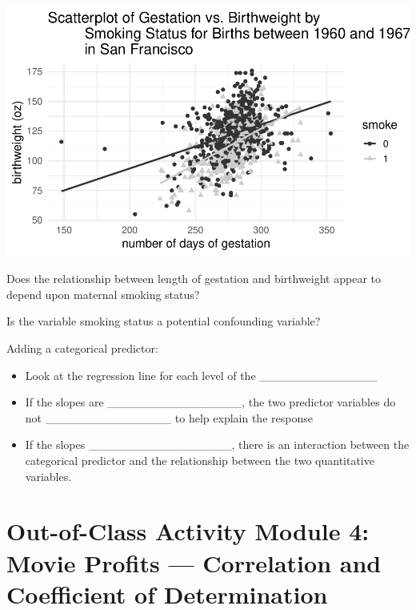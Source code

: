\documentclass[
]{report}
\begin{document}
\begin{center}\includegraphics[width=0.8\linewidth]{04-LN04-two-quantitativeEDA_files/figure-latex/unnamed-chunk-8-1} \end{center}

Does the relationship between length of gestation and birthweight appear to depend upon maternal smoking status?

\vspace{1in}

Is the variable smoking status a potential confounding variable?

\vspace{1in}

Adding a categorical predictor:


\begin{itemize}
\item
  Look at the regression line for each level of the \_\_\_\_\_\_\_\_\_\_\_\_\_\_
\item
  If the slopes are \_\_\_\_\_\_\_\_\_\_\_\_\_\_\_\_, the two predictor variables do not \_\_\_\_\_\_\_\_\_\_\_\_\_\_\_ to help explain the response
\item
  If the slopes \_\_\_\_\_\_\_\_\_\_\_\_\_\_\_\_\_, there is an interaction between the categorical predictor and the relationship between the two quantitative variables.
\end{itemize}


\newpage

\hypertarget{out-of-class-activity-module-4-movie-profits-correlation-and-coefficient-of-determination}{%
\section{Out-of-Class Activity Module 4: Movie Profits --- Correlation and Coefficient of Determination}\label{out-of-class-activity-module-4-movie-profits-correlation-and-coefficient-of-determination}}
\end{document}
